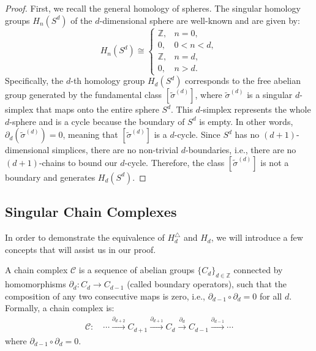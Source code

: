 \begin{proof}
	First, we recall the general homology of spheres. The singular homology groups $H_n(S^d)$ of the $d$-dimensional sphere are well-known and are given by:
    \[
    H_n(S^d) \cong 
    \begin{cases}
        \mathbb{Z}, & n = 0, \\
        0, & 0 < n < d, \\
        \mathbb{Z}, & n = d, \\
        0, & n > d.
    \end{cases}
    \]
    Specifically, the $d$-th homology group $H_d(S^d)$ corresponds to the free abelian group generated by the fundamental class $[\tilde{\sigma}^{(d)}]$, where $\tilde{\sigma}^{(d)}$ is a singular $d$-simplex that maps onto the entire sphere $S^d$. This $d$-simplex represents the whole $d$-sphere and is a cycle because the boundary of $S^d$ is empty. In other words, $\partial_d(\tilde{\sigma}^{(d)}) = 0$, meaning that $[\tilde{\sigma}^{(d)}]$ is a $d$-cycle. Since $S^d$ has no $(d+1)$-dimensional simplices, there are no non-trivial $d$-boundaries, i.e., there are no $(d+1)$-chains to bound our $d$-cycle. Therefore, the class $[\tilde{\sigma}^{(d)}]$ is not a boundary and generates $H_d(S^d)$.
\end{proof}

\subsection{Singular Chain Complexes}
\label{SingularChainComplexes}
In order to demonstrate the equivalence of \( H_{d}^{\triangle} \) and \( H_{d} \), we will introduce a few concepts that will assist us in our proof.

\begin{definition}
	\label{ChainComplex}
	A chain complex $\mathcal{C}$ is a sequence of abelian groups \(\{C_d\}_{d \in \mathbb{Z}}\) connected by homomorphisms \(\partial_d: C_d \to C_{d-1}\) (called boundary operators), such that the composition of any two consecutive maps is zero, i.e., \(\partial_{d-1} \circ \partial_d = 0\) for all \(d\). Formally, a chain complex is:
	\begin{align}
		\mathcal{C}: \quad\cdots \xrightarrow{\partial_{d+2}} C_{d+1} \xrightarrow{\partial_{d+1}} C_d \xrightarrow{\partial_d} C_{d-1} \xrightarrow{\partial_{d-1}} \cdots 
	\end{align}
	where \(\partial_{d-1} \circ \partial_d = 0\).
\end{definition}

